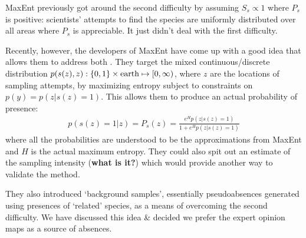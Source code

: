 MaxEnt previously got around the second difficulty by assuming $S_s\propto 1$ where $P_s$ is positive: scientists' attempts to find the species are uniformly distributed over all areas where $P_s$ is appreciable. It just didn't deal with the first difficulty. 

Recently, however, the developers of MaxEnt have come up with a good idea that allows them to address both \cite{Phillips:2008p12219}. They target the mixed continuous/discrete distribution $p(s(z), z) : \{0,1\}\times\textup{earth}\mapsto [0,\infty)$, where $z$ are the locations of sampling attempts, by maximizing entropy subject to constraints on $p(y)=p(z|s(z)=1)$. This allows them to produce an actual probability of presence:
\begin{eqnarray*}
    p(s(z)=1|z) = P_s(z)=\frac{e^H p(z|s(z)=1)}{1+e^H p(z|s(z)=1)}
\end{eqnarray*}
where all the probabilities are understood to be the approximations from MaxEnt and $H$ is the actual maximum entropy. They could also spit out an estimate of the sampling intensity (\textbf{what is it?}) which would provide another way to validate the method.

They also introduced `background samples', essentially pseudoabsences generated using presences of `related' species, as a means of overcoming the second difficulty. We have discussed this idea \& decided we prefer the expert opinion maps as a source of absences.



